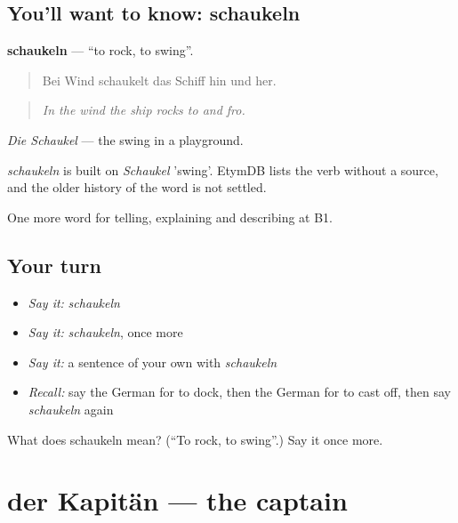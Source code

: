 \subsection*{You'll want to know: schaukeln}
\textbf{schaukeln} — \textquotedblleft{}to rock, to swing\textquotedblright{}.

\begin{quote}
Bei Wind schaukelt das Schiff hin und her.
\end{quote}

\begin{quote}
\emph{In the wind the ship rocks to and fro.}
\end{quote}

\emph{Die Schaukel} — the swing in a playground.

\begin{cousinweb}
\emph{schaukeln} is built on \emph{Schaukel} 'swing'. EtymDB lists the verb without a source, and the older history of the word is not settled.
\end{cousinweb}

\begin{grammarlens}[title={What you've built}]
One more word for telling, explaining and describing at B1.
\end{grammarlens}

\subsection*{Your turn}
\begin{itemize}
\raggedright
  \item \emph{Say it:} \emph{schaukeln}
  \item \emph{Say it:} \emph{schaukeln}, once more
  \item \emph{Say it:} a sentence of your own with \emph{schaukeln}
  \item \emph{Recall:} say the German for to dock, then the German for to cast off, then say \emph{schaukeln} again
\end{itemize}

\begin{tcolorbox}[breakable,colback=teal!4,colframe=teal!35!black,title={Before you move on}]
What does schaukeln mean? (\textquotedblleft{}To rock, to swing\textquotedblright{}.) Say it once more.
\end{tcolorbox}
\section[der Kapitän]{der Kapitän — the captain}

